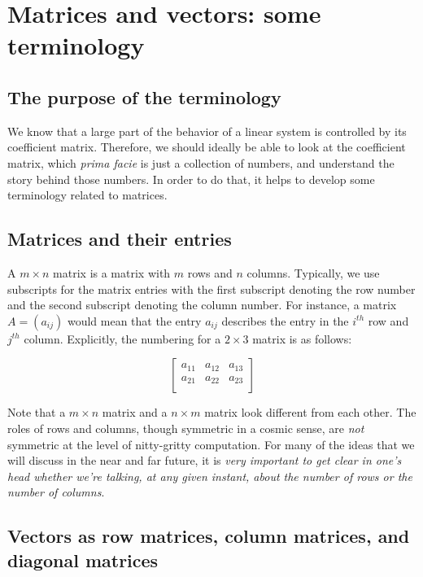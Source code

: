 \documentclass[10pt]{amsart}
\begin{document}
\section{Matrices and vectors: some terminology}

\subsection{The purpose of the terminology}

We know that a large part of the behavior of a linear system is
controlled by its coefficient matrix. Therefore, we should ideally be
able to look at the coefficient matrix, which {\em prima facie} is
just a collection of numbers, and understand the story behind those
numbers. In order to do that, it helps to develop some terminology
related to matrices.

\subsection{Matrices and their entries}

A $m \times n$ matrix is a matrix with $m$ rows and $n$
columns. Typically, we use subscripts for the matrix entries with the
first subscript denoting the row number and the second subscript
denoting the column number. For instance, a matrix $A = (a_{ij})$
would mean that the entry $a_{ij}$ describes the entry in the $i^{th}$
row and $j^{th}$ column. Explicitly, the numbering for a $2 \times 3$
matrix is as follows:

$$\left[\begin{matrix} a_{11} & a_{12} & a_{13} \\ a_{21} & a_{22} & a_{23} \\\end{matrix} \right]$$

Note that a $m \times n$ matrix and a $n \times m$ matrix look
different from each other. The roles of rows and columns, though
symmetric in a cosmic sense, are {\em not} symmetric at the level of
nitty-gritty computation. For many of the ideas that we will discuss
in the near and far future, it is {\em very important to get clear in
  one's head whether we're talking, at any given instant, about the
  number of rows or the number of columns}.
\subsection{Vectors as row matrices, column matrices, and diagonal matrices}
\end{document}
